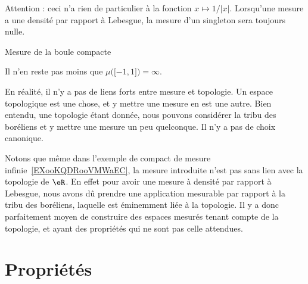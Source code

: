 \begin{example}
\begin{subproof}
    Attention : ceci n'a rien de particulier à la fonction \( x\mapsto 1/| x |\). Lorsqu'une mesure a une densité par rapport à Lebesgue, la mesure d'un singleton sera toujours nulle.

\item[Mesure de la boule compacte]

    Il n'en reste pas moins que \( \mu\big( \mathopen[ -1 , 1 \mathclose] \big)=\infty\).

    \end{subproof}
\end{example}

\begin{normaltext}
     En réalité, il n'y a pas de liens forts entre mesure et topologie. Un espace topologique est une chose, et y mettre une mesure en est une autre. Bien entendu, une topologie étant donnée, nous pouvons considérer la tribu des boréliens et y mettre une mesure un peu quelconque. Il n'y a pas de choix canonique.

     Notons que même dans l'exemple de compact de mesure infinie~\ref{EXooKQDRooVMWaEC}, la mesure introduite n'est pas sans lien avec la topologie de \( \eR\). En effet pour avoir une mesure à densité par rapport à Lebesgue, nous avons dû prendre une application mesurable par rapport à la tribu des boréliens, laquelle est éminemment liée à la topologie. Il y a donc parfaitement moyen de construire des espaces mesurés tenant compte de la topologie, et ayant des propriétés qui ne sont pas celle attendues.
\end{normaltext}

\section{Propriétés}

